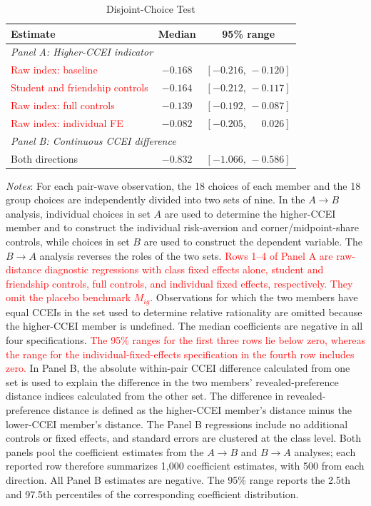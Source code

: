 \documentclass[11 pt]{article}
\begin{document}
\begin{table}[H]
\centering
\caption{Disjoint-Choice Test}
\label{tab:disjoint_choice}
\begin{tabular}{lcc}
\toprule
Estimate & Median & 95\% range \\
\midrule
\multicolumn{3}{l}{\emph{Panel A: Higher-CCEI indicator}} \\
\textcolor{red}{Raw index: baseline}
    & $-0.168$ & $[-0.216,\,-0.120]$ \\
\textcolor{red}{Student and friendship controls}
    & $-0.164$ & $[-0.212,\,-0.117]$ \\
\textcolor{red}{Raw index: full controls}
    & $-0.139$ & $[-0.192,\,-0.087]$ \\
\textcolor{red}{Raw index: individual FE}
    & $-0.082$ & $[-0.205,\,\phantom{-}0.026]$ \\
\midrule
\multicolumn{3}{l}{\emph{Panel B: Continuous CCEI difference}} \\
Both directions
    & $-0.832$ & $[-1.066,\,-0.586]$ \\
\bottomrule
\end{tabular}

\begin{minipage}{\textwidth}
{\footnotesize \emph{Notes}: For each pair-wave observation, the 18 choices of each member and the 18 group choices are independently divided into two sets of nine. In the $A\rightarrow B$ analysis, individual choices in set $A$ are used to determine the higher-CCEI member and to construct the individual risk-aversion and corner/midpoint-share controls, while choices in set $B$ are used to construct the dependent variable. The $B\rightarrow A$ analysis reverses the roles of the two sets. \textcolor{red}{Rows 1--4 of Panel A are raw-distance diagnostic regressions with class fixed effects alone, student and friendship controls, full controls, and individual fixed effects, respectively. They omit the placebo benchmark $M_{ig}$.} Observations for which the two members have equal CCEIs in the set used to determine relative rationality are omitted because the higher-CCEI member is undefined. The median coefficients are negative in all four specifications. \textcolor{red}{The 95\% ranges for the first three rows lie below zero, whereas the range for the individual-fixed-effects specification in the fourth row includes zero.} In Panel B, the absolute within-pair CCEI difference calculated from one set is used to explain the difference in the two members' revealed-preference distance indices calculated from the other set. The difference in revealed-preference distance is defined as the higher-CCEI member's distance minus the lower-CCEI member's distance. The Panel B regressions include no additional controls or fixed effects, and standard errors are clustered at the class level. Both panels pool the coefficient estimates from the $A\rightarrow B$ and $B\rightarrow A$ analyses; each reported row therefore summarizes 1,000 coefficient estimates, with 500 from each direction. All Panel B estimates are negative. The 95\% range reports the 2.5th and 97.5th percentiles of the corresponding coefficient distribution.}
\end{minipage}
\end{table}
\end{document}
